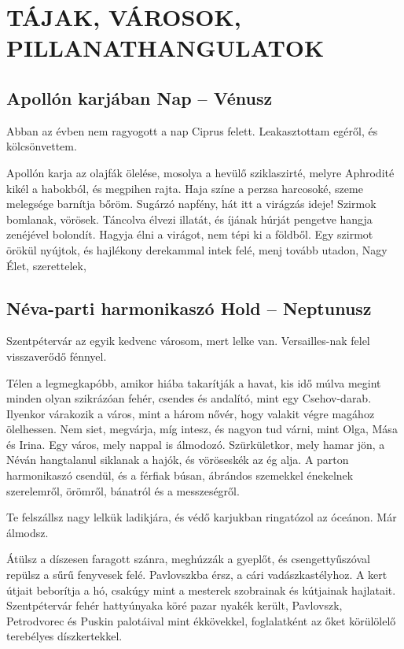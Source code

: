 \clearpage
\chapter{TÁJAK, VÁROSOK, PILLANATHANGULATOK}

\section{Apollón karjában \hfill Nap -- Vénusz}

Abban az évben nem ragyogott a nap Ciprus felett. Leakasztottam
egéről, és kölcsönvettem.

Apollón karja az olajfák ölelése, mosolya a hevülő sziklaszirté,
melyre Aphrodité kikél a habokból, és megpihen rajta. Haja színe a
perzsa harcosoké, szeme melegsége barnítja bőröm. Sugárzó napfény,
hát itt a virágzás ideje! Szirmok bomlanak, vörösek. Táncolva élvezi
illatát, és íjának húrját pengetve hangja zenéjével bolondít. Hagyja élni a
virágot, nem tépi ki a földből. Egy szirmot örökül nyújtok, és hajlékony
derekammal intek felé, menj tovább utadon, Nagy Élet, szerettelek,

\section{Néva-parti harmonikaszó \hfill Hold -- Nep\-tu\-nusz}

Szentpétervár az egyik kedvenc városom, mert lelke van. Versailles-nak
felel visszaverődő fénnyel.

Télen a legmegkapóbb, amikor hiába takarítják a havat, kis idő
múlva megint minden olyan szikrázóan fehér, csendes és andalító,
mint egy Csehov-darab. Ilyenkor várakozik a város, mint a három nővér,
hogy valakit végre magához ölelhessen. Nem siet, megvárja, míg
intesz, és nagyon tud várni, mint Olga, Mása és Irina. Egy város, mely
nappal is álmodozó. Szürkületkor, mely hamar jön, a Néván hangtalanul
siklanak a hajók, és vöröseskék az ég alja. A parton harmonikaszó
csendül, és a férfiak búsan, ábrándos szemekkel énekelnek szerelemről,
örömről, bánatról és a messzeségről.

Te felszállsz nagy lelkük ladikjára, és védő karjukban ringatózol az
óceánon. Már álmodsz.

Átülsz a díszesen faragott szánra, meghúzzák a gyeplőt, és csengettyűszóval
repülsz a sűrű fenyvesek felé. Pavlovszkba érsz, a cári vadászkastélyhoz.
A kert útjait beborítja a hó, csakúgy mint a mesterek
szobrainak és kútjainak hajlatait. Szentpétervár fehér hattyúnyaka
köré pazar nyakék került, Pavlovszk, Petrodvorec és Puskin palotáival
mint ékkövekkel, foglalatként az őket körülölelő terebélyes díszkertekkel.

